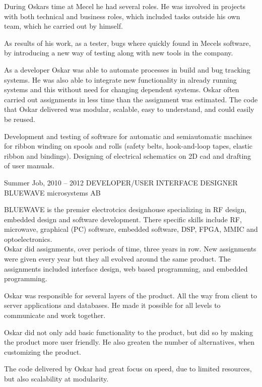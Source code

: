 \documentclass[fontsize=10pt]{tccv}
\begin{document}
\begin{eventlist}
During Oskars time at Mecel he had several roles. He was involved in projects
with both technical and business roles, which included tasks outside his own
team, which he carried out by himself.

As results of his work, as a tester, bugs where quickly found in Mecels
software, by introducing a new way of testing along with new tools in the
company.

As a developer Oskar was able to automate processes in build and bug tracking
systems. He was also able to integrate new functionality in already running
systems and this without need for changing dependent systems. Oskar often
carried out assignments in less time than the assignment was estimated. The
code that Oskar delivered was modular, scalable, easy to understand, and could
easily be reused.


Development and testing of software for automatic and semiautomatic
machines for ribbon winding on spools and rolls (safety belts,
hook-and-loop tapes, elastic ribbon and bindings). Designing of
electrical schematics on 2D cad and drafting of user manuals.

\item{Summer Job, 2010 -- 2012}
     {DEVELOPER/USER INTERFACE DESIGNER}
     {BLUEWAVE microsystems AB}


     BLUEWAVE is the premier electrotcics designhouse specializing in RF
     design, embedded design and software development. There specific skills
     include RF, microwave, graphical (PC) software, embedded software, DSP,
     FPGA, MMIC and optoelectronics. \\

     Oskar did assignments, over periods of time, three years in row. New
     assignments were given every year but they all evolved around the same
     product. The assignments included interface design, web based programming,
     and embedded programming.

     Oskar was responsible for several layers of the product. All the way from
     client to server applications and databases. He made it possible for all
     levels to communicate and work together.

     Oskar did not only add basic functionality to the product, but did so by
     making the product more user friendly. He also greaten the number of
     alternatives, when customizing the product.

     The code delivered by Oskar had great focus on speed, due to limited
     resources, but also scalability at modularity.

\end{eventlist}
\end{document}
